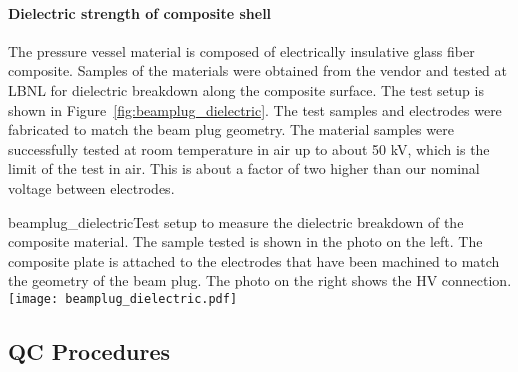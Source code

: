 \paragraph{Dielectric strength of composite shell}
The pressure vessel material is composed of electrically insulative glass fiber composite. Samples of the materials were obtained from the vendor and tested at LBNL for dielectric breakdown along the composite surface. The test setup is shown in Figure~\ref{fig:beamplug_dielectric}. The test samples and electrodes were fabricated to match the beam plug geometry. The material samples were successfully tested at room temperature in air up to about 50 kV, which is the limit of the test in air. This is about a factor of two higher than our nominal voltage between electrodes.
\begin{cdrfigure}{beamplug_dielectric}{Test setup to measure the dielectric breakdown of the composite material. The sample tested is shown in the photo on the left. The composite plate is attached to the electrodes that have been machined to match the geometry of the beam plug. The photo on the right shows the HV connection.}
  \texttt{[image: beamplug\_dielectric.pdf]}
\end{cdrfigure}





\subsection{QC Procedures}

